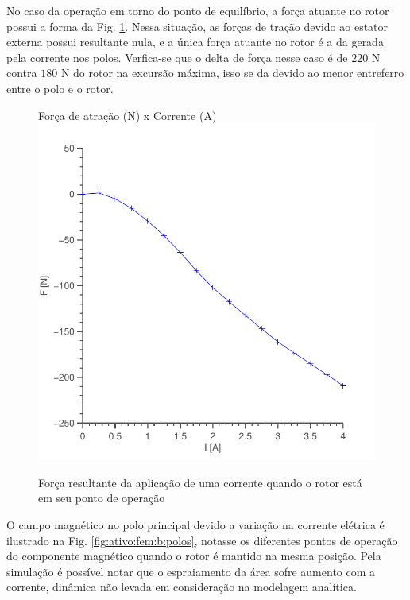 No caso da operação em torno do ponto de equilíbrio, a força atuante no rotor possui a forma da Fig. \ref{ativo_otimizado_fem_I_dx00}. Nessa situação, as forças de tração devido ao estator externa possui resultante nula, e a única força atuante no rotor é a da gerada pela corrente nos polos. Verfica-se que o delta de força nesse caso é de $220$ N contra $180$ N do rotor na excursão máxima, isso se da devido ao menor entreferro entre o polo e o rotor.

\begin{figure}[ht!]
\centering
Força de atração (N) x Corrente (A)
\includegraphics[width=0.8\linewidth]{Figs/Simulacoes/Ativo/ativo_otimizado_fem_I_dx00}
\caption{Força resultante da aplicação de uma corrente quando o rotor está em seu ponto de operação}
\label{ativo_otimizado_fem_I_dx00}
\end{figure}

O campo magnético no polo principal devido a variação na corrente elétrica é ilustrado na Fig. \ref{fig:ativo:fem:b:polos}, notasse os diferentes pontos de operação do componente magnético quando o rotor é mantido na mesma posição. Pela simulação é possível notar que o espraiamento da área sofre aumento com a corrente, dinâmica não levada em consideração na modelagem analítica. 

